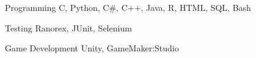 

\begin{cvskills}


  \cvskill
    {Programming} %
    {C, Python, C\#, C++, Java, R, HTML, SQL, Bash} %

  \cvskill
    {Testing} %
    {Ranorex, JUnit, Selenium} %

  \cvskill
    {Game Development} %
    {Unity, GameMaker:Studio} %

\end{cvskills}